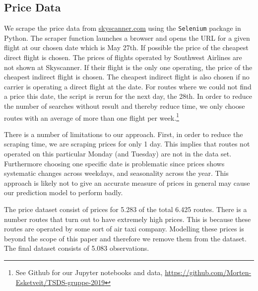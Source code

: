 \subsection{Price Data}
We scrape the price data from \url{skyscanner.com} using the \texttt{Selenium} package in Python. The scraper function launches a browser and opens the URL for a given flight at our chosen date which is May 27th. If possible the price of the cheapest direct flight is chosen. The prices of flights operated by Southwest Airlines are not shown at Skyscanner. If their flight is the only one operating, the price of the cheapest indirect flight is chosen. The cheapest indirect flight is also chosen if no carrier is operating a direct flight at the date. For routes where we could not find a price this date, the script is rerun for the next day, the 28th. In order to reduce the number of searches without result and thereby reduce time, we only choose routes with an average of more than one flight per week.\footnote{See Github for our Jupyter notebooks and data, \url{https://github.com/Morten-Esketveit/TSDS-gruppe-2019}}

There is a number of limitations to our approach. First, in order to reduce the scraping time, we are scraping prices for only 1 day. This implies that routes not operated on this particular Monday (and Tuesday) are not in the data set. Furthermore choosing one specific date is problematic since prices shows systematic changes across weekdays, and seasonality across the year. This approach is likely not to give an accurate measure of prices in general may cause our prediction model to perform badly. 

The price dataset consist of prices for 5.283 of the total 6.425 routes. There is a number routes that turn out to have extremely high prices. This is because these routes are operated by some sort of air taxi company. Modelling these prices is beyond the scope of this paper and therefore we remove them from the dataset. The final dataset consists of 5.083 observations.




